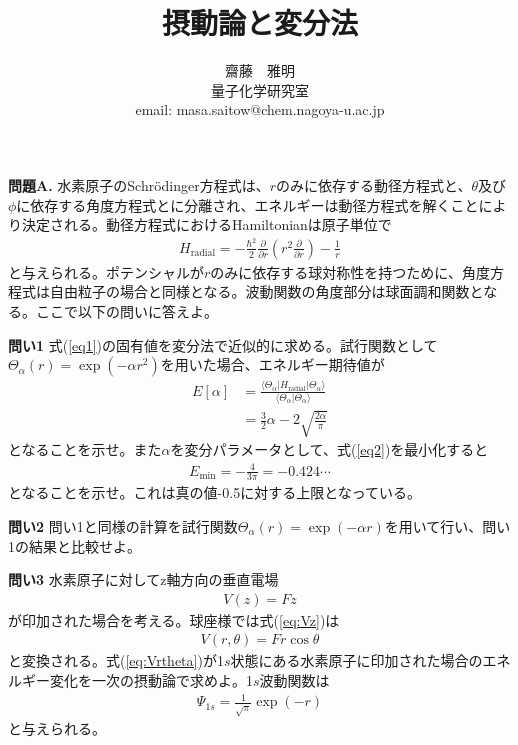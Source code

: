 \documentclass[11pt,pra,aps]{revtex4}
\begin{document}
\title{摂動論と変分法}
\author{齋藤　雅明 \\ 量子化学研究室 \\ email: masa.saitow@chem.nagoya-u.ac.jp}

\maketitle

\noindent
{\bf 問題A.} 水素原子のSchr\"odinger方程式は、$r$のみに依存する動径方程式と、$\theta$及び$\phi$に依存する角度方程式とに分離され、エネルギーは動径方程式を解くことにより決定される。動径方程式におけるHamiltonianは原子単位で
\begin{align}
  H_\text{radial}=-\frac{\hbar^2}{2}\frac{\partial}{\partial r}\left(r^2 \frac{\partial}{\partial r}\right) - \frac{1}{r} \label{eq1}
\end{align}
と与えられる。ポテンシャルが$r$のみに依存する球対称性を持つために、角度方程式は自由粒子の場合と同様となる。波動関数の角度部分は球面調和関数となる。ここで以下の問いに答えよ。

\noindent
{\bf 問い1} 式(\ref{eq1})の固有値を変分法で近似的に求める。試行関数として$\Theta_\alpha(r)=\exp(-\alpha r^2)$を用いた場合、エネルギー期待値が
\begin{align}
  E[\alpha] &= \frac{\langle\Theta_\alpha|H_\text{radial}|\Theta_\alpha\rangle}{\langle\Theta_\alpha|\Theta_\alpha\rangle} \\ \nonumber
            &= \frac{3}{2}\alpha - 2\sqrt{\frac{2\alpha}{\pi}} \label{eq2}
\end{align}
となることを示せ。また$\alpha$を変分パラメータとして、式(\ref{eq2})を最小化すると
\begin{align}
  E_\text{min}=-\frac{4}{3\pi}=-0.424\cdots
\end{align}
となることを示せ。これは真の値-0.5に対する上限となっている。

\noindent
{\bf 問い2} 問い1と同様の計算を試行関数$\Theta_\alpha(r)=\exp(-\alpha r)$を用いて行い、問い1の結果と比較せよ。

\noindent
{\bf 問い3} 水素原子に対してz軸方向の垂直電場
\begin{align}
  V(z)=Fz \label{eq:Vz}
\end{align}
が印加された場合を考える。球座様では式(\ref{eq:Vz})は
\begin{align}
  V(r,\theta)=Fr\cos\theta \label{eq:Vrtheta}
\end{align}
と変換される。式(\ref{eq:Vrtheta})が1$s$状態にある水素原子に印加された場合のエネルギー変化を一次の摂動論で求めよ。1$s$波動関数は
\begin{align}
  \Psi_{1s}=\frac{1}{\sqrt{\pi}} \exp(-r)
\end{align}
と与えられる。
\end{document}

